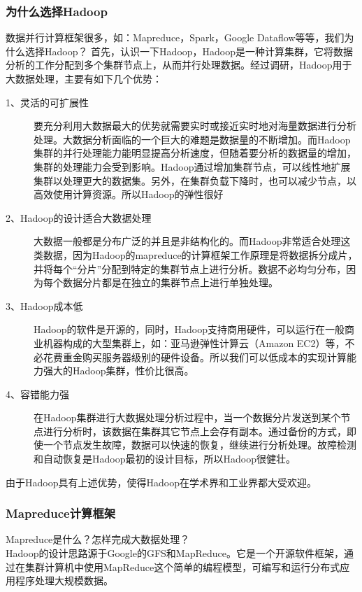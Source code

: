 \documentclass[a4paper, 11pt]{article}                                                   %
\begin{document}
\begin{CJK*}{UTF8}{song}
\subsubsection{为什么选择Hadoop}
数据并行计算框架很多，如：Mapreduce，Spark，Google Dataflow等等，我们为什么选择Hadoop？
首先，认识一下Hadoop，Hadoop是一种计算集群，它将数据分析的工作分配到多个集群节点上，从而并行处理数据。经过调研，Hadoop用于大数据处理，主要有如下几个优势：
\begin{description}
  \item[1、灵活的可扩展性] 要充分利用大数据最大的优势就需要实时或接近实时地对海量数据进行分析处理。大数据分析面临的一个巨大的难题是数据量的不断增加。而Hadoop集群的并行处理能力能明显提高分析速度，但随着要分析的数据量的增加，集群的处理能力会受到影响。Hadoop通过增加集群节点，可以线性地扩展集群以处理更大的数据集。另外，在集群负载下降时，也可以减少节点，以高效使用计算资源。所以Hadoop的弹性很好
  \item[2、Hadoop的设计适合大数据处理] 大数据一般都是分布广泛的并且是非结构化的。而Hadoop非常适合处理这类数据，因为Hadoop的mapreduce的计算框架工作原理是将数据拆分成片，并将每个“分片”分配到特定的集群节点上进行分析。数据不必均匀分布，因为每个数据分片都是在独立的集群节点上进行单独处理。
  \item[3、Hadoop成本低] Hadoop的软件是开源的，同时，Hadoop支持商用硬件，可以运行在一般商业机器构成的大型集群上，如：亚马逊弹性计算云（Amazon EC2）等，不必花费重金购买服务器级别的硬件设备。所以我们可以低成本的实现计算能力强大的Hadoop集群，性价比很高。
  \item[4、容错能力强] 在Hadoop集群进行大数据处理分析过程中，当一个数据分片发送到某个节点进行分析时，该数据在集群其它节点上会存有副本。通过备份的方式，即使一个节点发生故障，数据可以快速的恢复，继续进行分析处理。故障检测和自动恢复是Hadoop最初的设计目标，所以Hadoop很健壮。
\end{description}
由于Hadoop具有上述优势，使得Hadoop在学术界和工业界都大受欢迎。\\
\subsubsection{Mapreduce计算框架}
Mapreduce是什么？怎样完成大数据处理？\\
Hadoop的设计思路源于Google的GFS和MapReduce。它是一个开源软件框架，通过在集群计算机中使用MapReduce这个简单的编程模型，可编写和运行分布式应用程序处理大规模数据。


\end{CJK*}
\end{document}
